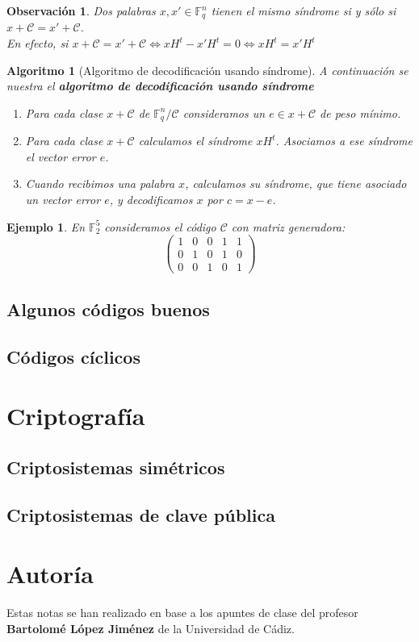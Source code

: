 \documentclass[spanish]{book}
\newtheorem{alg}{Algoritmo}
\newtheorem{ejem}{Ejemplo}
\newtheorem{obsv}{Observación}
\begin{document}
\begin{obsv}
	Dos palabras $x, x' \in \mathbb{F}_q^n$ tienen el mismo síndrome si y sólo si $x + \mathcal{C}=x'+\mathcal{C}$. \\
	En efecto, si $x+\mathcal{C}=x'+\mathcal{C} \Longleftrightarrow xH^t-x'H^t=0 \Longleftrightarrow xH^t=x'H^t$
\end{obsv}

\begin{alg}[Algoritmo de decodificación usando síndrome]
	A continuación se nuestra el \textbf{algoritmo de decodificación usando síndrome}
	\begin{enumerate}
		\item Para cada clase $x+\mathcal{C}$ de $\mathbb{F}_q^n/\mathcal{C}$ consideramos un $e \in x+\mathcal{C}$ de peso mínimo.
		\item Para cada clase $x+\mathcal{C}$ calculamos el síndrome $xH^t$. Asociamos a ese síndrome el vector error $e$.
		\item Cuando recibimos una palabra $x$, calculamos su síndrome, que tiene asociado un vector error $e$, y decodificamos $x$ por $c=x-e$.
	\end{enumerate}
\end{alg}

\begin{ejem}
	En $\mathbb{F}_2^5$ consideramos el código $\mathcal{C}$ con matriz generadora:
		$$
		\left(
		\begin{array}{ccccc}
		1 & 0 & 0 & 1 & 1 \\
		0 & 1 & 0 & 1 & 0 \\
		0 & 0 & 1 & 0 & 1
		\end{array} \right)
		$$
\end{ejem}

\section{Algunos códigos buenos}
\section{Códigos cíclicos}

\chapter{Criptografía}
\section{Criptosistemas simétricos}
\section{Criptosistemas de clave pública}

\chapter*{Autoría}
Estas notas se han realizado en base a los apuntes de clase del profesor \textbf{Bartolomé López Jiménez} de la Universidad de Cádiz.
\end{document}

